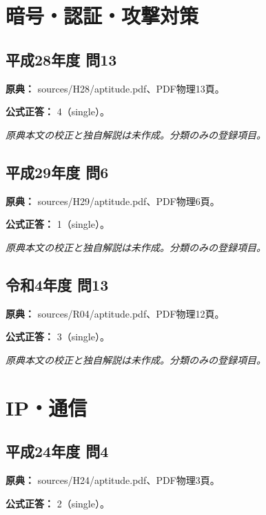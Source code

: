 \section{暗号・認証・攻撃対策}

\subsection{平成28年度 問13}
\label{q:h28-reg-apt-13}

\noindent\textbf{原典：} sources/H28/aptitude.pdf、PDF物理13頁。

\textbf{公式正答：} 4（single）。

\par\textit{原典本文の校正と独自解説は未作成。分類のみの登録項目。}

\subsection{平成29年度 問6}
\label{q:h29-reg-apt-06}

\noindent\textbf{原典：} sources/H29/aptitude.pdf、PDF物理6頁。

\textbf{公式正答：} 1（single）。

\par\textit{原典本文の校正と独自解説は未作成。分類のみの登録項目。}

\subsection{令和4年度 問13}
\label{q:r04-reg-apt-13}

\noindent\textbf{原典：} sources/R04/aptitude.pdf、PDF物理12頁。

\textbf{公式正答：} 3（single）。

\par\textit{原典本文の校正と独自解説は未作成。分類のみの登録項目。}

\section{IP・通信}

\subsection{平成24年度 問4}
\label{q:h24-reg-apt-04}

\noindent\textbf{原典：} sources/H24/aptitude.pdf、PDF物理3頁。

\textbf{公式正答：} 2（single）。

